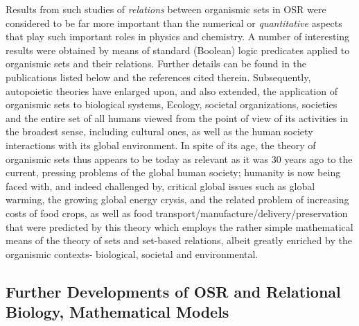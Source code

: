 \documentclass[12pt]{article}
\theoremstyle{plain}
\theoremstyle{definition}
\numberwithin{equation}{section}
\begin{document}
 Results from such studies of {\em relations} between organismic sets in OSR were considered to be far more important than the numerical or {\em quantitative} aspects that play such important roles in physics and chemistry. 
A number of interesting results were obtained by means of standard (Boolean) logic predicates applied to organismic sets and their relations. Further details can be found in the publications listed below and the references cited therein. Subsequently, autopoietic theories have enlarged upon, and also extended, the application of organismic sets to biological systems, Ecology, societal organizations, societies and the entire set of all humans viewed from the point of view of its activities in the broadest sense, including cultural ones, as well as the human society interactions with its global environment. In spite of its age, the theory of organismic sets thus appears to be today as relevant as it was 30 years ago to the current, pressing problems of the global human society; humanity is now being faced with, and indeed challenged by, critical global issues such as global warming, the growing global energy crysis, and the related problem of increasing costs of food crops, as well as food transport/manufacture/delivery/preservation that were predicted by this theory which employs the rather simple mathematical means of the theory of sets and set-based relations, albeit greatly enriched by the organismic contexts- biological, societal and environmental. 

\subsection{Further Developments of OSR and Relational Biology, Mathematical Models}
\end{document}
